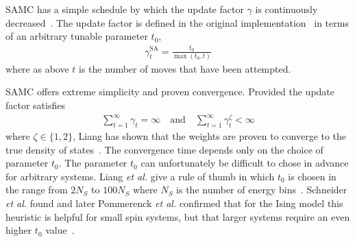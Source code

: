 \documentclass[letterpaper,twocolumn,amsmath,amssymb,pre,aps,10pt]{revtex4-1}
\begin{document}
SAMC has a simple schedule by which the update factor $\gamma$ is continuously
decreased~\cite{liang2007stochastic, werlich2015stochastic,
schneider2017convergence}.  The update factor is defined in the
original implementation~\cite{liang2007stochastic} in terms of an
arbitrary tunable parameter $t_0$,
\begin{align}
\gamma_{t}^{\text{SA}} =\frac{t_0}{\max(t_0,t)}
\end{align}
where as above $t$ is the number of moves that have been attempted.

SAMC offers extreme simplicity and proven convergence.
Provided the update factor satisfies
\begin{align}
\sum_{t=1}^\infty \gamma_{t} = \infty \quad\textrm{and}\quad
\sum_{t=1}^\infty \gamma_{t}^\zeta < \infty
\end{align}
where $\zeta \in \{1,2\}$, Liang has shown that the weights are proven
to converge to the true density of states~\cite{liang2006theory,
liang2007stochastic}. The convergence time depends only on the choice of
parameter $t_0$.
The parameter $t_0$ can unfortunately be difficult to chose in advance
for arbitrary systems.
Liang \emph{et al.} give a rule of thumb in
which $t_0$ is chosen in the range from $2N_S$ to $100N_S$ where $N_S$
is the number of energy bins~\cite{liang2007stochastic}.  Schneider
\emph{et al.} found and later Pommerenck \emph{et al.} confirmed that for the Ising model this heuristic is helpful for small spin systems, but that larger systems require an even higher $t_0$ value~\cite{schneider2017convergence, pommerenck2020flat}.
\end{document}
